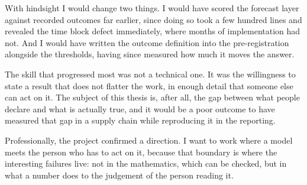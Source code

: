 With hindsight I would change two things. I would have scored the forecast layer against
recorded outcomes far earlier, since doing so took a few hundred lines and revealed the time
block defect immediately, where months of implementation had not. And I would have written
the outcome definition into the pre-registration alongside the thresholds, having since
measured how much it moves the answer.

The skill that progressed most was not a technical one. It was the willingness to state a
result that does not flatter the work, in enough detail that someone else can act on it. The
subject of this thesis is, after all, the gap between what people declare and what is
actually true, and it would be a poor outcome to have measured that gap in a supply chain
while reproducing it in the reporting.

Professionally, the project confirmed a direction. I want to work where a model meets the
person who has to act on it, because that boundary is where the interesting failures live:
not in the mathematics, which can be checked, but in what a number does to the judgement of
the person reading it.
